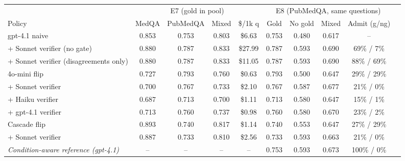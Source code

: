 \begin{tabular}{lccccccccc}
\toprule
 & \multicolumn{4}{c}{E7 (gold in pool)} & \multicolumn{4}{c}{E8 (PubMedQA, same questions)} \\
\cmidrule(lr){2-5}\cmidrule(lr){6-9}
Policy & MedQA & PubMedQA & Mixed & \$/1k q & Gold & No gold & Mixed & Admit (g/ng) \\
\midrule
gpt-4.1 naive & 0.853 & 0.753 & 0.803 & \$6.63 & 0.753 & 0.480 & 0.617 & -- \\
\quad + Sonnet verifier (no gate) & 0.880 & 0.787 & 0.833 & \$27.99 & 0.787 & 0.593 & 0.690 & 69\% / 7\% \\
\quad + Sonnet verifier (disagreements only) & 0.880 & 0.787 & 0.833 & \$11.05 & 0.787 & 0.593 & 0.690 & 88\% / 69\% \\
4o-mini flip & 0.727 & 0.793 & 0.760 & \$0.63 & 0.793 & 0.500 & 0.647 & 29\% / 29\% \\
\quad + Sonnet verifier & 0.700 & 0.767 & 0.733 & \$2.10 & 0.767 & 0.587 & 0.677 & 21\% / 0\% \\
\quad + Haiku verifier & 0.687 & 0.713 & 0.700 & \$1.11 & 0.713 & 0.580 & 0.647 & 15\% / 1\% \\
\quad + gpt-4.1 verifier & 0.713 & 0.760 & 0.737 & \$0.98 & 0.760 & 0.580 & 0.670 & 23\% / 2\% \\
Cascade flip & 0.893 & 0.740 & 0.817 & \$1.14 & 0.740 & 0.553 & 0.647 & 27\% / 29\% \\
\quad + Sonnet verifier & 0.887 & 0.733 & 0.810 & \$2.56 & 0.733 & 0.593 & 0.663 & 21\% / 0\% \\
\midrule
\textit{Condition-aware reference (gpt-4.1)} & -- & -- & -- & -- & 0.753 & 0.593 & 0.673 & 100\% / 0\% \\
\bottomrule
\end{tabular}
